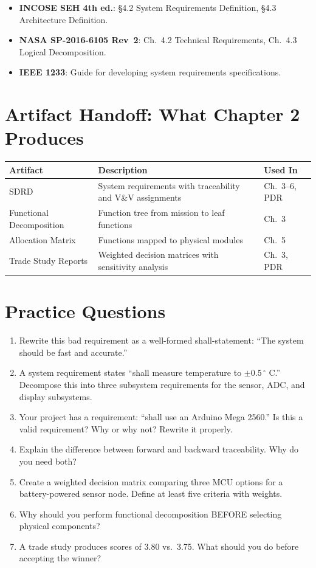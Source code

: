 \documentclass[11pt,letterpaper,twoside,openany]{book}
\begin{document}
\begin{keyconceptbox}
\begin{itemize}[nosep,leftmargin=1.5em]
\item \textbf{INCOSE SEH 4th ed.}: \S4.2 System Requirements Definition, \S4.3 Architecture Definition.
\item \textbf{NASA SP-2016-6105 Rev~2}: Ch.~4.2 Technical Requirements, Ch.~4.3 Logical Decomposition.
\item \textbf{IEEE 1233}: Guide for developing system requirements specifications.
\end{itemize}
\end{keyconceptbox}

\section{Artifact Handoff: What Chapter 2 Produces}
\begin{table}[htbp]\centering\small
\begin{tabularx}{\textwidth}{l X l}
\toprule
\textbf{Artifact} & \textbf{Description} & \textbf{Used In} \\
\midrule
SDRD & System requirements with traceability and V\&V assignments & Ch.~3--6, PDR \\
Functional Decomposition & Function tree from mission to leaf functions & Ch.~3 \\
Allocation Matrix & Functions mapped to physical modules & Ch.~5 \\
Trade Study Reports & Weighted decision matrices with sensitivity analysis & Ch.~3, PDR \\
\bottomrule
\end{tabularx}
\end{table}

\section{Practice Questions}
\begin{enumerate}[leftmargin=1.5em]
\item Rewrite this bad requirement as a well-formed shall-statement: ``The system should be fast and accurate.''
\item A system requirement states ``shall measure temperature to $\pm$0.5\,$^{\circ}$ C.'' Decompose this into three subsystem requirements for the sensor, ADC, and display subsystems.
\item Your project has a requirement: ``shall use an Arduino Mega 2560.'' Is this a valid requirement? Why or why not? Rewrite it properly.
\item Explain the difference between forward and backward traceability. Why do you need both?
\item Create a weighted decision matrix comparing three MCU options for a battery-powered sensor node. Define at least five criteria with weights.
\item Why should you perform functional decomposition BEFORE selecting physical components?
\item A trade study produces scores of 3.80 vs.\ 3.75. What should you do before accepting the winner?
\end{enumerate}
\end{document}
